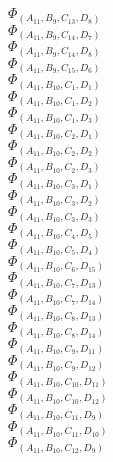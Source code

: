 \documentclass[14pt]{article}
\begin{document}
    $\Phi_{({A}_{11}, {B}_{9}, {C}_{13}, {D}_{8})}$ \\ 
    $\Phi_{({A}_{11}, {B}_{9}, {C}_{14}, {D}_{7})}$ \\ 
    $\Phi_{({A}_{11}, {B}_{9}, {C}_{14}, {D}_{8})}$ \\ 
    $\Phi_{({A}_{11}, {B}_{9}, {C}_{15}, {D}_{6})}$ \\ 
    $\Phi_{({A}_{11}, {B}_{10}, {C}_{1}, {D}_{1})}$ \\ 
    $\Phi_{({A}_{11}, {B}_{10}, {C}_{1}, {D}_{2})}$ \\ 
    $\Phi_{({A}_{11}, {B}_{10}, {C}_{1}, {D}_{3})}$ \\ 
    $\Phi_{({A}_{11}, {B}_{10}, {C}_{2}, {D}_{1})}$ \\ 
    $\Phi_{({A}_{11}, {B}_{10}, {C}_{2}, {D}_{2})}$ \\ 
    $\Phi_{({A}_{11}, {B}_{10}, {C}_{2}, {D}_{3})}$ \\ 
    $\Phi_{({A}_{11}, {B}_{10}, {C}_{3}, {D}_{1})}$ \\ 
    $\Phi_{({A}_{11}, {B}_{10}, {C}_{3}, {D}_{2})}$ \\ 
    $\Phi_{({A}_{11}, {B}_{10}, {C}_{3}, {D}_{3})}$ \\ 
    $\Phi_{({A}_{11}, {B}_{10}, {C}_{4}, {D}_{5})}$ \\ 
    $\Phi_{({A}_{11}, {B}_{10}, {C}_{5}, {D}_{4})}$ \\ 
    $\Phi_{({A}_{11}, {B}_{10}, {C}_{6}, {D}_{15})}$ \\ 
    $\Phi_{({A}_{11}, {B}_{10}, {C}_{7}, {D}_{13})}$ \\ 
    $\Phi_{({A}_{11}, {B}_{10}, {C}_{7}, {D}_{14})}$ \\ 
    $\Phi_{({A}_{11}, {B}_{10}, {C}_{8}, {D}_{13})}$ \\ 
    $\Phi_{({A}_{11}, {B}_{10}, {C}_{8}, {D}_{14})}$ \\ 
    $\Phi_{({A}_{11}, {B}_{10}, {C}_{9}, {D}_{11})}$ \\ 
    $\Phi_{({A}_{11}, {B}_{10}, {C}_{9}, {D}_{12})}$ \\ 
    $\Phi_{({A}_{11}, {B}_{10}, {C}_{10}, {D}_{11})}$ \\ 
    $\Phi_{({A}_{11}, {B}_{10}, {C}_{10}, {D}_{12})}$ \\ 
    $\Phi_{({A}_{11}, {B}_{10}, {C}_{11}, {D}_{9})}$ \\ 
    $\Phi_{({A}_{11}, {B}_{10}, {C}_{11}, {D}_{10})}$ \\ 
    $\Phi_{({A}_{11}, {B}_{10}, {C}_{12}, {D}_{9})}$ \\ 
\end{document}
